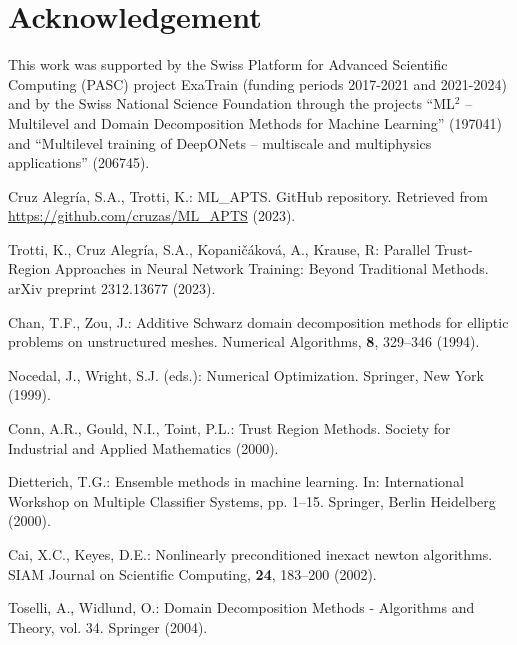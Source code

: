 \documentclass{article}
\begin{document}
\section*{Acknowledgement}
This work was supported by the Swiss Platform for Advanced Scientific Computing (PASC) project ExaTrain (funding periods 2017-2021 and 2021-2024) and by the Swiss National Science Foundation through the projects ``ML$^2$ -- Multilevel and Domain Decomposition Methods for Machine Learning'' (197041) and ``Multilevel training of DeepONets -- multiscale and multiphysics applications'' (206745). 


\begin{thebibliography}{40.}%

 Cruz Alegría, S.A., Trotti, K.: ML\_APTS. GitHub repository. Retrieved from \url{https://github.com/cruzas/ML_APTS} (2023).

 Trotti, K., Cruz Alegría, S.A., Kopaničáková, A., Krause, R: Parallel Trust-Region Approaches in Neural Network Training: Beyond Traditional Methods. arXiv preprint 2312.13677 (2023).

 Chan, T.F., Zou, J.: Additive Schwarz domain decomposition methods for elliptic problems on unstructured meshes. Numerical Algorithms, \textbf{8}, 329–346 (1994).

 Nocedal, J., Wright, S.J. (eds.): Numerical Optimization. Springer, New York (1999).

 Conn, A.R., Gould, N.I., Toint, P.L.: Trust Region Methods. Society for Industrial and Applied Mathematics (2000).

 Dietterich, T.G.: Ensemble methods in machine learning. In: International Workshop on Multiple Classifier Systems, pp. 1–15. Springer, Berlin Heidelberg (2000).

 Cai, X.C., Keyes, D.E.: Nonlinearly preconditioned inexact newton algorithms. SIAM Journal on Scientific Computing, \textbf{24}, 183–200 (2002).

 Toselli, A., Widlund, O.: Domain Decomposition Methods - Algorithms and Theory, vol. 34. Springer (2004). 


\end{thebibliography}
\end{document}
